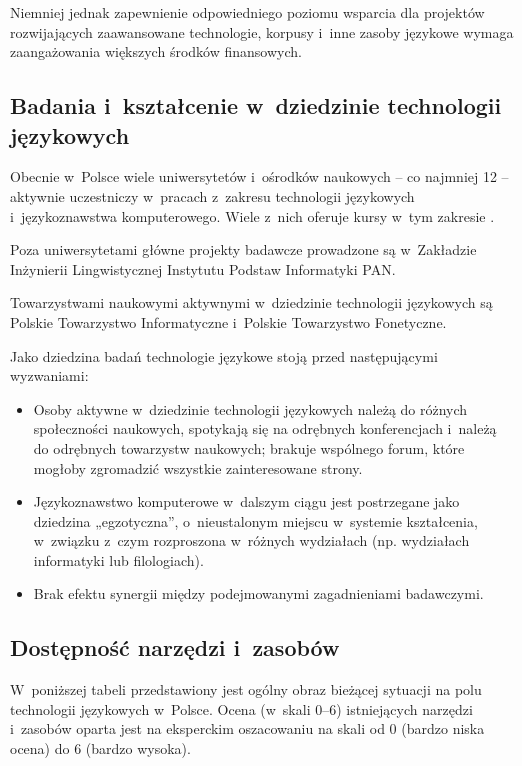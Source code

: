 \begin{multicols}{2}
Niemniej jednak zapewnienie odpowiedniego poziomu wsparcia dla
projektów rozwijających zaawansowane technologie, korpusy i~inne
zasoby językowe wymaga zaangażowania większych środków
finansowych. 

\subsection[Badania i~kształcenie w~dziedzinie technologii
językowych]{Badania i~kształcenie w~dziedzinie technologii
językowych} 

Obecnie w~Polsce wiele uniwersytetów i~ośrodków naukowych -- co
najmniej 12 -- aktywnie uczestniczy w~pracach z~zakresu technologii
językowych i~językoznawstwa komputerowego. Wiele z~nich oferuje
kursy w~tym zakresie \cite{centers1}. 

Poza uniwersytetami główne projekty badawcze prowadzone są
w~Zakładzie Inżynierii Lingwistycznej Instytutu Podstaw Informatyki
PAN. 

Towarzystwami naukowymi aktywnymi w~dziedzinie technologii językowych
są Polskie Towarzystwo Informatyczne i~Polskie Towarzystwo
Fonetyczne. 

Jako dziedzina badań technologie językowe stoją przed
następującymi wyzwaniami: 

\begin{itemize} \item Osoby aktywne w~dziedzinie technologii
językowych należą do różnych społeczności naukowych, spotykają
się na odrębnych konferencjach i~należą do odrębnych towarzystw
naukowych; brakuje wspólnego forum, które mogłoby zgromadzić
wszystkie zainteresowane strony. \item Językoznawstwo komputerowe
w~dalszym ciągu jest postrzegane jako dziedzina „egzotyczna”,
o~nieustalonym miejscu w~systemie kształcenia, w~związku z~czym
rozproszona w~różnych wydziałach (np. wydziałach informatyki lub
filologiach). \item Brak efektu synergii między podejmowanymi
zagadnieniami badawczymi. \end{itemize} 

\subsection[Dostępność narzędzi i~zasobów]{Dostępność
narzędzi i~zasobów} W~poniższej tabeli przedstawiony jest ogólny
obraz bieżącej sytuacji na polu technologii językowych w~Polsce.
Ocena (w~skali 0--6) istniejących narzędzi i~zasobów oparta jest na
eksperckim oszacowaniu na skali od 0 (bardzo niska ocena) do 6 (bardzo
wysoka). 


\end{multicols}

